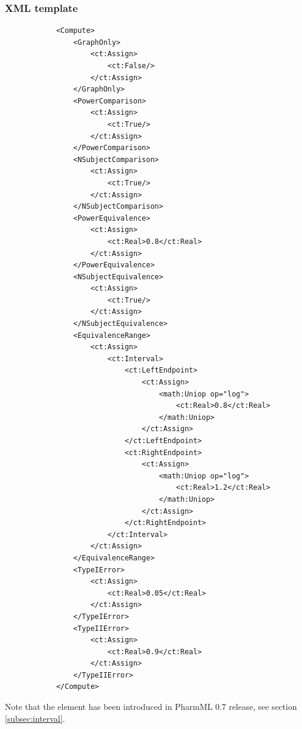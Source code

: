 \subsubsection{XML template}
\lstset{language=XML}
\begin{lstlisting}
            <Compute>
                <GraphOnly>
                    <ct:Assign>
                        <ct:False/>
                    </ct:Assign>
                </GraphOnly>
                <PowerComparison>
                    <ct:Assign>
                        <ct:True/>
                    </ct:Assign>
                </PowerComparison>
                <NSubjectComparison>
                    <ct:Assign>
                        <ct:True/>
                    </ct:Assign>
                </NSubjectComparison>
                <PowerEquivalence>
                    <ct:Assign>
                        <ct:Real>0.8</ct:Real>
                    </ct:Assign>
                </PowerEquivalence>
                <NSubjectEquivalence>
                    <ct:Assign>
                        <ct:True/>
                    </ct:Assign>
                </NSubjectEquivalence>
                <EquivalenceRange>
                    <ct:Assign>
                        <ct:Interval>
                            <ct:LeftEndpoint>
                                <ct:Assign>
                                    <math:Uniop op="log">
                                        <ct:Real>0.8</ct:Real>
                                    </math:Uniop>
                                </ct:Assign>
                            </ct:LeftEndpoint>
                            <ct:RightEndpoint>
                                <ct:Assign>
                                    <math:Uniop op="log">
                                        <ct:Real>1.2</ct:Real>
                                    </math:Uniop>
                                </ct:Assign>
                            </ct:RightEndpoint>
                        </ct:Interval>
                    </ct:Assign>
                </EquivalenceRange>
                <TypeIError>
                    <ct:Assign>
                        <ct:Real>0.05</ct:Real>
                    </ct:Assign>
                </TypeIError>
                <TypeIIError>
                    <ct:Assign>
                        <ct:Real>0.9</ct:Real>
                    </ct:Assign>
                </TypeIIError>
            </Compute>
\end{lstlisting}
Note that the  element has been introduced in PharmML 0.7
release, see section \ref{subsec:interval}.
\newline

